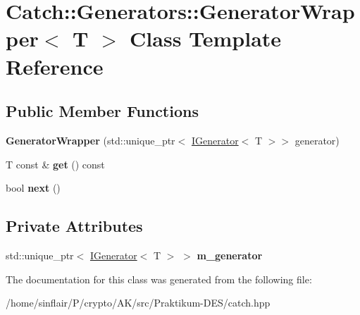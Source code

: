 \hypertarget{classCatch_1_1Generators_1_1GeneratorWrapper}{}\section{Catch\+:\+:Generators\+:\+:Generator\+Wrapper$<$ T $>$ Class Template Reference}
\label{classCatch_1_1Generators_1_1GeneratorWrapper}
\subsection*{Public Member Functions}
\begin{DoxyCompactItemize}
\item 
\mbox{\label{classCatch_1_1Generators_1_1GeneratorWrapper_aecffeafd4fd38d91a52dadf28b6e2b29}} 
{\bfseries Generator\+Wrapper} (std\+::unique\+\_\+ptr$<$ \hyperlink{structCatch_1_1Generators_1_1IGenerator}{I\+Generator}$<$ T $>$$>$ generator)
\item 
\mbox{\label{classCatch_1_1Generators_1_1GeneratorWrapper_a271f0f905f2c473c907550435b81e102}} 
T const  \& {\bfseries get} () const
\item 
\mbox{\label{classCatch_1_1Generators_1_1GeneratorWrapper_acbfdca94811ae02461bd2cf5f60b666e}} 
bool {\bfseries next} ()
\end{DoxyCompactItemize}
\subsection*{Private Attributes}
\begin{DoxyCompactItemize}
\item 
\mbox{\label{classCatch_1_1Generators_1_1GeneratorWrapper_a8f35291599183b36e4c5af78e17d3a8c}} 
std\+::unique\+\_\+ptr$<$ \hyperlink{structCatch_1_1Generators_1_1IGenerator}{I\+Generator}$<$ T $>$ $>$ {\bfseries m\+\_\+generator}
\end{DoxyCompactItemize}


The documentation for this class was generated from the following file\+:\begin{DoxyCompactItemize}
\item 
/home/sinflair/\+P/crypto/\+A\+K/src/\+Praktikum-\/\+D\+E\+S/catch.\+hpp\end{DoxyCompactItemize}
